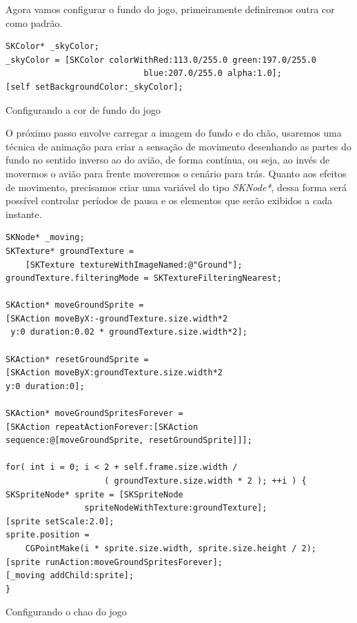 \documentclass[a4paper,12pt,brazil,oneside]{book}
\begin{document}
Agora vamos configurar o fundo do jogo, primeiramente definiremos outra cor como padrão.

\begin{listing}[H]
\begin{verbatim}
SKColor* _skyColor;
_skyColor = [SKColor colorWithRed:113.0/255.0 green:197.0/255.0 
							blue:207.0/255.0 alpha:1.0];
[self setBackgroundColor:_skyColor];
\end{verbatim}
\caption{Configurando a cor de fundo do jogo}
\end{listing}

O próximo passo envolve carregar a imagem do fundo e do chão, usaremos uma técnica de animação para criar a sensação de movimento desenhando as partes do fundo no sentido inverso ao do avião, de forma contínua, ou seja, ao invés de movermos o avião para frente moveremos o cenário para trás.
Quanto aos efeitos de movimento, precisamos criar uma variável do tipo \emph{SKNode*}, dessa forma será possível controlar períodos de pausa e os elementos que serão exibidos a cada instante.

\begin{listing}[H]
\begin{verbatim}
SKNode* _moving;
SKTexture* groundTexture = 
	[SKTexture textureWithImageNamed:@"Ground"];
groundTexture.filteringMode = SKTextureFilteringNearest;
        
SKAction* moveGroundSprite = 
[SKAction moveByX:-groundTexture.size.width*2
 y:0 duration:0.02 * groundTexture.size.width*2];
 
SKAction* resetGroundSprite = 
[SKAction moveByX:groundTexture.size.width*2 
y:0 duration:0];

SKAction* moveGroundSpritesForever = 
[SKAction repeatActionForever:[SKAction 
sequence:@[moveGroundSprite, resetGroundSprite]]];
           
for( int i = 0; i < 2 + self.frame.size.width / 
					( groundTexture.size.width * 2 ); ++i ) {
SKSpriteNode* sprite = [SKSpriteNode 
				spriteNodeWithTexture:groundTexture];
[sprite setScale:2.0];
sprite.position = 
	CGPointMake(i * sprite.size.width, sprite.size.height / 2);
[sprite runAction:moveGroundSpritesForever];
[_moving addChild:sprite];
}
\end{verbatim}
\caption{Configurando o chao do jogo}
\end{listing}
\end{document}
